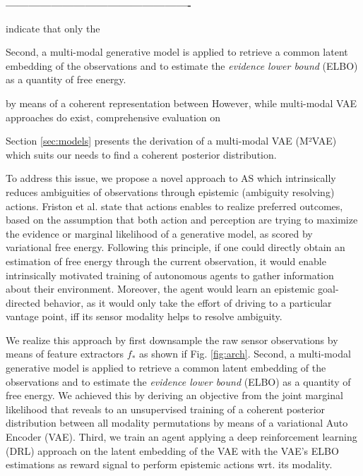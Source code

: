 \begin{confidential}
\textbf{-------------------------------------------------}

indicate that only the  

Second, a multi-modal generative model is applied to retrieve a common latent embedding of the observations and to estimate the \textit{evidence lower bound} (ELBO) as a quantity of free energy.


by means of a coherent representation between 
However, while multi-modal VAE approaches do exist, comprehensive evaluation on 

Section \ref{sec:models} presents the derivation of a multi-modal VAE (M²VAE) which suits our needs to find a coherent posterior distribution.




To address this issue, we propose a novel approach to AS which intrinsically reduces ambiguities of observations through epistemic (ambiguity resolving) actions. %
%
Friston et al. \cite{Friston2010} state that actions enables to realize preferred outcomes, based on the assumption that both action and perception are trying to maximize the evidence or marginal likelihood of a generative model, as scored by variational free energy.
Following this principle, if one could directly obtain an estimation of free energy through the current observation, it would enable intrinsically motivated training of autonomous agents to gather information about their environment.
%
Moreover, the agent would learn an epistemic goal-directed behavior, as it would only take the effort of driving to a particular vantage point, iff its sensor modality helps to resolve ambiguity.

%
We realize this approach by first downsample the raw sensor observations by means of feature extractors $f_{*}$ as shown if Fig. \ref{fig:arch}. 
%
Second, a multi-modal generative model is applied to retrieve a common latent embedding of the observations and to estimate the \textit{evidence lower bound} (ELBO) as a quantity of free energy.
%
We achieved this by deriving an objective from the joint marginal likelihood that reveals to an unsupervised training of a coherent posterior distribution between all modality permutations by means of a variational Auto Encoder (VAE).
%
Third, we train an agent applying a deep reinforcement learning (DRL) approach on the latent embedding of the VAE with the VAE's ELBO estimations as reward signal to perform epistemic actions wrt. its modality.


\end{confidential}
